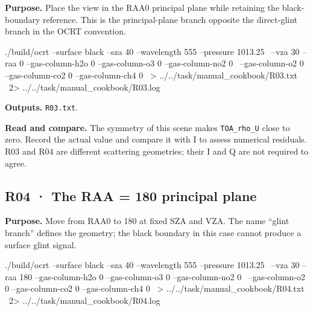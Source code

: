 \label{recipe:R03}

\textbf{Purpose. }Place the view in the RAA0\textdegree{} principal plane while retaining the black-boundary reference. This is the principal-plane branch opposite the direct-glint branch in the OCRT convention.

\noindent\begin{minipage}{\linewidth}
\begin{ManualCode}

./build/ocrt --surface black --sza 40 --wavelength 555 --pressure 1013.25 \
  --vza 30 --raa 0 --gas-column-h2o 0 --gas-column-o3 0 --gas-column-no2 0 \
  --gas-column-o2 0 --gas-column-co2 0 --gas-column-ch4 0 \
  > ../../task/manual_cookbook/R03.txt \
  2> ../../task/manual_cookbook/R03.log

\end{ManualCode}
\end{minipage}\par

\textbf{Outputs. }\texttt{R03.txt}.

\textbf{Read and compare. }The symmetry of this scene makes \texttt{TOA\_\allowbreak{}rho\_\allowbreak{}U} close to zero. Record the actual value and compare it with I to assess numerical residuals. R03 and R04 are different scattering geometries; their I and Q are not required to agree.

\Needspace{17\baselineskip}

\subsection{R04 · The RAA = 180 principal plane}
\label{sec:auto:09_cookbook:2.4}

\label{recipe:R04}

\textbf{Purpose. }Move from RAA0\textdegree{} to 180\textdegree{} at fixed SZA and VZA. The name “glint branch” defines the geometry; the black boundary in this case cannot produce a surface glint signal.

\noindent\begin{minipage}{\linewidth}
\begin{ManualCode}

./build/ocrt --surface black --sza 40 --wavelength 555 --pressure 1013.25 \
  --vza 30 --raa 180 --gas-column-h2o 0 --gas-column-o3 0 --gas-column-no2 0 \
  --gas-column-o2 0 --gas-column-co2 0 --gas-column-ch4 0 \
  > ../../task/manual_cookbook/R04.txt \
  2> ../../task/manual_cookbook/R04.log

\end{ManualCode}
\end{minipage}\par

